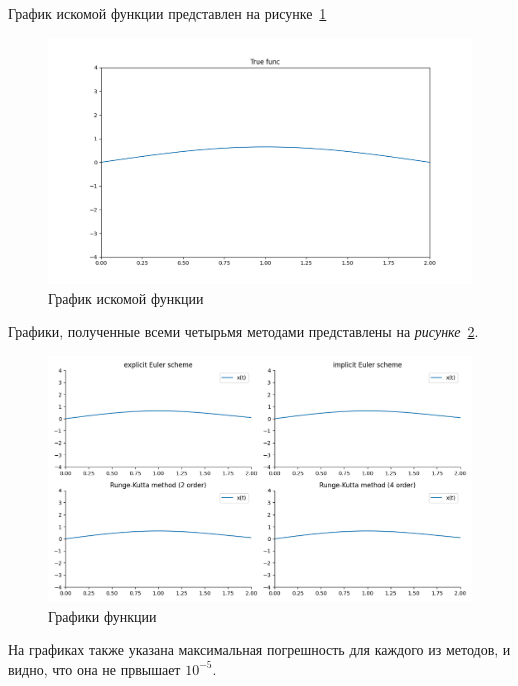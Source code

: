 \documentclass[a4paper,12pt]{article}
\begin{document}
	График искомой функции представлен на рисунке~\ref{fig:fig15}

	\begin{figure}[ht!]
		\begin{center}
		\includegraphics[scale=0.43]{figures/true_1.png}
		\end{center}
		\vspace*{-8mm}
		\caption{График искомой функции}\label{fig:fig15}
  	\end{figure}


	Графики, полученные всеми четырьмя методами представлены на \textit{рисунке}~\ref{fig:fig1}.

	\begin{figure}[ht!]
		\begin{center}
		\includegraphics[scale=0.43]{figures/test_1.png}
		\end{center}
		\vspace*{-8mm}
		\caption{Графики функции}\label{fig:fig1}
  	\end{figure}

  	На графиках также указана максимальная погрешность для каждого 
	из методов, и видно, что она не првышает $10^{-5}$.
\end{document}
